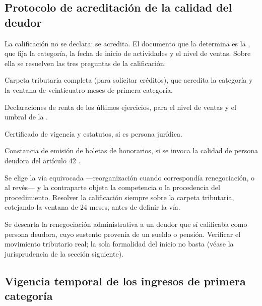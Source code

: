 \subsection{Protocolo de acreditación de la calidad del deudor}

La calificación no se declara: se acredita. El documento que la determina es la
, que fija la categoría, la fecha de inicio
de actividades y el nivel de ventas. Sobre ella se resuelven las tres preguntas de la
calificación:

\begin{checklist}
  \item Carpeta tributaria completa (para solicitar créditos), que acredita la categoría y la
  ventana de veinticuatro meses de primera categoría.
  \item Declaraciones de renta de los últimos ejercicios, para el nivel de ventas y el umbral de
  la \Lpyme{}.
  \item Certificado de vigencia y estatutos, si es persona jurídica.
  \item Constancia de emisión de boletas de honorarios, si se invoca la calidad de persona
  deudora del artículo 42 .
\end{checklist}

{Se elige la vía equivocada ---reorganización cuando correspondía renegociación, o al revés--- y
la contraparte objeta la competencia o la procedencia del procedimiento.}
{Resolver la calificación siempre sobre la carpeta tributaria, cotejando la ventana de 24 meses,
antes de definir la vía.}

{Se descarta la renegociación administrativa a un deudor que sí calificaba como persona deudora,
cuyo sustento provenía de un sueldo o pensión.}
{Verificar el movimiento tributario real; la sola formalidad del inicio no basta (véase la
jurisprudencia de la sección siguiente).}

\bloqueJurisprudencial

\subsection{Vigencia temporal de los ingresos de primera categoría}

